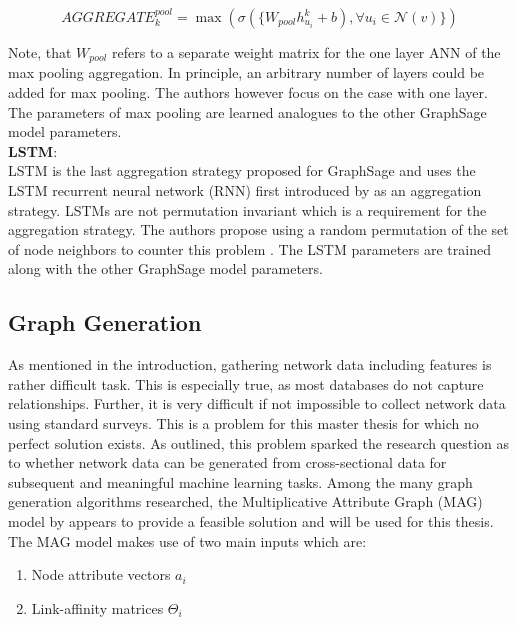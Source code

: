 	\begin{equation}
		AGGREGATE_{k}^{pool} = \max\left(\sigma(\{W_{pool}h_{u_{i}}^{k} +
		b),\forall u_{i} \in \mathcal{N}(v)\}\right)
	\end{equation}

	\noindent Note, that $W_{pool}$ refers to a separate weight matrix for the 
	one layer ANN of the max pooling aggregation. In principle, an arbitrary 
	number of layers could be added for max pooling. The authors 
	\cite{hamilton2017inductive} however focus on the case with one layer. The
	parameters of max pooling are learned analogues to the other GraphSage
	model parameters. \\ 

	\noindent\textbf{LSTM}:\\
	\noindent LSTM is the last aggregation strategy proposed for GraphSage and
	uses the LSTM recurrent neural network (RNN) first introduced by
	\cite{hochreiter1997long} as an aggregation strategy. LSTMs are not
	permutation invariant which is a requirement for the aggregation strategy.
	The authors propose using a random permutation of the set of node neighbors 
	to counter this problem \citep[p. 5]{hamilton2017inductive}. The LSTM
	parameters are trained along with the other GraphSage model parameters.  

	\subsection{Graph Generation}

	\noindent As mentioned in the introduction, gathering network data
	including features is rather difficult task. This is especially true, as
	most databases do not capture relationships. Further, it is very difficult
	if not impossible to collect network data using standard surveys. This is a 
	problem for this master thesis for which no perfect solution exists. As
	outlined, this problem sparked the research question as to whether network
	data can be generated from cross-sectional data for subsequent and
	meaningful machine learning tasks. Among the many graph generation 
	algorithms researched, the Multiplicative Attribute Graph (MAG) model by 
	\cite{kim2012multiplicative} appears to provide a feasible solution and
	will be used for this thesis. \\

	\noindent The MAG model makes use of two main inputs which are:

	\begin{enumerate}
		\item Node attribute vectors $a_i$
		\item Link-affinity matrices $\Theta_i$
	\end{enumerate}

